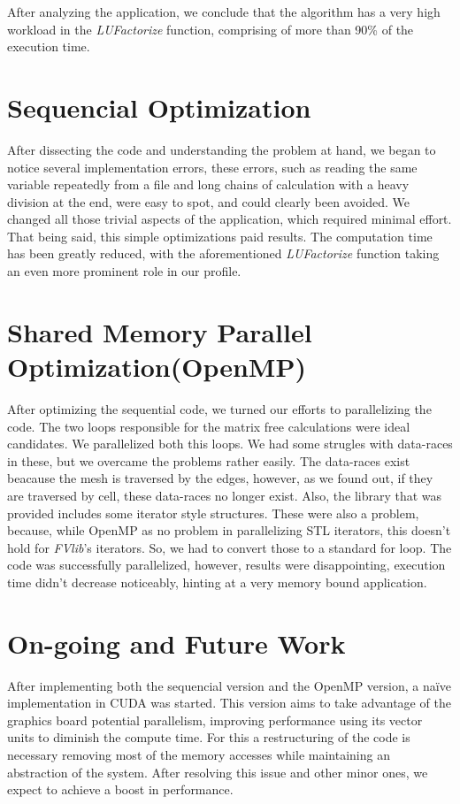 \documentclass[a4paper,10pt,openright,openbib,twocolumn]{article}
\begin{document}
After analyzing the application, we conclude that the algorithm has a very high workload in the \emph{LUFactorize} function, comprising of more than 90\% of the execution time.


\section{Sequencial Optimization}


After dissecting the code and understanding the problem at hand, we began to notice several implementation errors, these errors, such as reading the same variable repeatedly from a file and long chains of calculation with a heavy division at the end, were easy to spot, and could clearly been avoided. We changed all those trivial aspects of the application, which required minimal effort. That being said, this simple optimizations paid results. The computation time has been greatly reduced, with the aforementioned \emph{LUFactorize} function taking an even more prominent role in our profile.


\section{Shared Memory Parallel Optimization(OpenMP)}

After optimizing the sequential code, we turned our efforts to parallelizing the code. The two loops responsible for the matrix free calculations were ideal candidates. We parallelized both this loops. We had some strugles with data-races in these, but we overcame the problems rather easily. The data-races exist beacause the mesh is traversed by the edges, however, as we found out, if they are traversed by cell, these data-races no longer exist. Also, the library that was provided includes some iterator style structures. These were also a problem, because, while OpenMP as no problem in parallelizing STL iterators, this doesn't hold for \emph{FVlib}'s iterators. So, we had to convert those to a standard for loop. The code was successfully parallelized, however, results were disappointing, execution time didn't decrease noticeably, hinting at a very memory bound application. 

\section{On-going and Future Work}    %

After implementing both the sequencial version and the OpenMP version, a na\"{i}ve implementation in CUDA was started. This version aims to take advantage of the graphics board potential parallelism, improving performance using its vector units to diminish the compute time. For this a restructuring of the code is necessary removing most of the memory accesses while maintaining an abstraction of the system. After resolving this issue and other minor ones, we expect to achieve a boost in performance.
\end{document}

